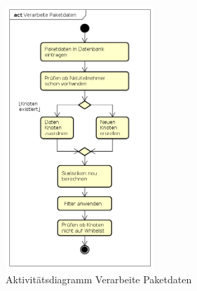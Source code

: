     \begin{figure}[h!]
        \centering
        \includegraphics[width=0.5\textwidth]{../diagrams/AD_Verarbeite_Paketdaten}
        \caption{Aktivitätsdiagramm Verarbeite Paketdaten}
    \end{figure}